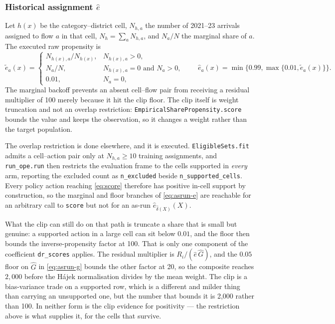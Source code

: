\documentclass[11pt,a4paper]{article}
\theoremstyle{plain}
\theoremstyle{definition}
\theoremstyle{remark}
\begin{document}
\subsubsection*{Historical assignment $\hat e$}

Let $h(x)$ be the category--district cell, $N_{h,a}$ the number of 2021--23 arrivals assigned to
flow $a$ in that cell, $N_h=\sum_aN_{h,a}$, and $N_a/N$ the marginal share of $a$. The executed
raw propensity is
\begin{equation}
\tilde e_a(x)=
\begin{cases}
N_{h(x),a}/N_{h(x)}, & N_{h(x),a}>0,\\
N_a/N, & N_{h(x),a}=0\text{ and }N_a>0,\\
0.01, & N_a=0,
\end{cases}
\qquad
\hat e_a(x)=\min\{0.99,\max\{0.01,\tilde e_a(x)\}\}.
\label{eq:asrun-e}
\end{equation}
The marginal backoff prevents an absent cell--flow pair from receiving a residual multiplier of
100 merely because it hit the clip floor. The clip itself is weight truncation and not an overlap
restriction: \texttt{EmpiricalSharePropensity.score} bounds the value and keeps the observation,
so it changes a weight rather than the target population.

The overlap restriction is done elsewhere, and it is executed. \texttt{EligibleSets.fit} admits a
cell--action pair only at $N_{h,a}\ge10$ training assignments, and \texttt{run\_ope.run} then
restricts the evaluation frame to the cells supported in \emph{every} arm, reporting the excluded
count as \texttt{n\_excluded} beside \texttt{n\_supported\_cells}. Every policy action reaching
\eqref{eq:score} therefore has positive in-cell support by construction, so the marginal and floor
branches of \eqref{eq:asrun-e} are reachable for an arbitrary call to \texttt{score} but not for an
as-run $\hat e_{\hat\delta(X)}(X)$.

What the clip can still do on that path is truncate a share that is small but genuine: a supported
action in a large cell can sit below $0.01$, and the floor then bounds the inverse-propensity
factor at 100. That is only one component of the coefficient \texttt{dr\_scores} applies. The
residual multiplier is $R_i/(\hat e\,\hat G)$, and the $0.05$ floor on $\hat G$ in
\eqref{eq:asrun-g} bounds the other factor at 20, so the composite reaches $2{,}000$ before the
H\'ajek normalisation divides by the mean weight. The clip is a bias-variance trade on a supported
row, which is a different and milder thing than carrying an unsupported one, but the number that
bounds it is 2,000 rather than 100. In neither form is the clip evidence for positivity --- the
restriction above is what supplies it, for the cells that survive.
\end{document}
